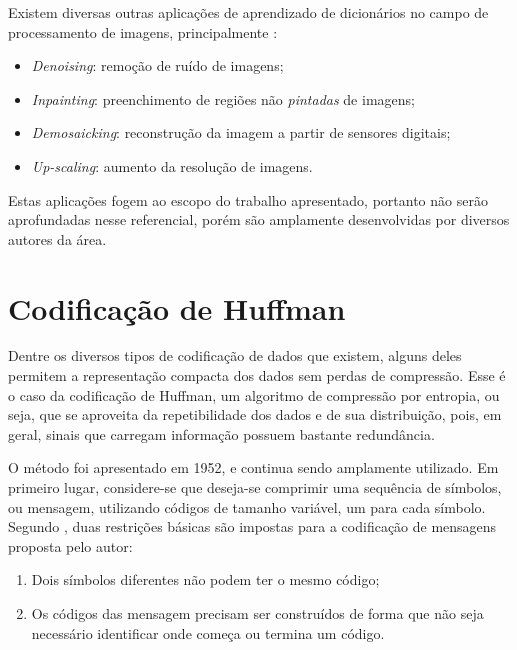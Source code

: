\documentclass[cic,tc]{iiufrgs}
\begin{document}
Existem diversas outras aplicações de aprendizado de dicionários no campo de processamento de
imagens, principalmente \cite{MairalSparse}:
\begin{itemize}
    \item \textit{Denoising}: remoção de ruído de imagens;
    \item \textit{Inpainting}: preenchimento de regiões não \textit{pintadas} de imagens;
    \item \textit{Demosaicking}: reconstrução da imagem a partir de sensores digitais;
    \item \textit{Up-scaling}: aumento da resolução de imagens.
\end{itemize}

Estas aplicações fogem ao escopo do trabalho apresentado, portanto não serão
aprofundadas nesse referencial, porém são amplamente desenvolvidas por diversos
autores da área.


\section{Codificação de Huffman}
Dentre os diversos tipos de codificação de dados que existem, alguns deles 
permitem a representação compacta dos dados sem perdas de compressão.
Esse é o caso da codificação de Huffman, um algoritmo de compressão por entropia,
ou seja, que se aproveita da repetibilidade dos dados e de sua distribuição, 
pois, em geral, sinais que carregam informação possuem bastante redundância.

O método foi apresentado em 1952, e continua sendo amplamente utilizado. 
Em primeiro lugar, considere-se que deseja-se comprimir uma sequência de 
símbolos, ou mensagem, utilizando códigos de tamanho variável, um para cada símbolo.
Segundo \citet{HuffmanCoding}, duas restrições básicas são impostas para 
a codificação de mensagens proposta pelo autor:
\begin{enumerate}
    \item Dois símbolos diferentes não podem ter o mesmo código;
    \item Os códigos das mensagem precisam ser construídos de forma que não seja necessário 
    identificar onde começa ou termina um código.
\end{enumerate}
\end{document}
